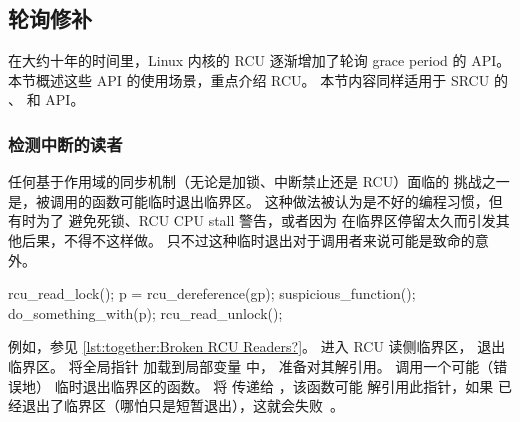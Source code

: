 \subsection{轮询修补}
\label{sec:together:Polling Patchups}

在大约十年的时间里，Linux 内核的 RCU 逐渐增加了轮询
grace period 的 API。
本节概述这些 API 的使用场景，重点介绍 RCU\@。
本节内容同样适用于 SRCU 的
、
和  API。

\subsubsection{检测中断的读者}
\label{sec:together:Detecting Broken Readers}

任何基于作用域的同步机制（无论是加锁、中断禁止还是 RCU）面临的
挑战之一是，被调用的函数可能临时退出临界区。
这种做法被认为是不好的编程习惯，但有时为了
避免死锁、RCU CPU stall 警告，或者因为
在临界区停留太久而引发其他后果，不得不这样做。
只不过这种临时退出对于调用者来说可能是致命的意外。

\begin{listing}[tbp] 
{ \scriptsize
\begin{fcvlabel}
\begin{VerbatimL}[commandchars=\\\[\]]
rcu_read_lock();					\lnlbl[rrl]
p = rcu_dereference(gp);				\lnlbl[rd]
suspicious_function();					\lnlbl[sf]
do_something_with(p);					\lnlbl[dsw]
rcu_read_unlock();					\lnlbl[rrul]
\end{VerbatimL}
\end{fcvlabel}
}
\caption{Broken RCU Readers?}
\label{lst:together:Broken RCU Readers?}
\end{listing}

\begin{fcvref}
例如，参见
\cref{lst:together:Broken RCU Readers?}。
 进入 RCU 读侧临界区，
退出临界区。
 将全局指针  加载到局部变量  中，
准备对其解引用。
 调用一个可能（错误地）
临时退出临界区的函数。
 将  传递给 ，该函数可能
解引用此指针，如果 
已经退出了临界区（哪怕只是短暂退出），这就会失败~\cite{LorenzoStoakes2025ReaderLeak,VlastimilBabka2025PollReaderLeak}。

\end{fcvref}

